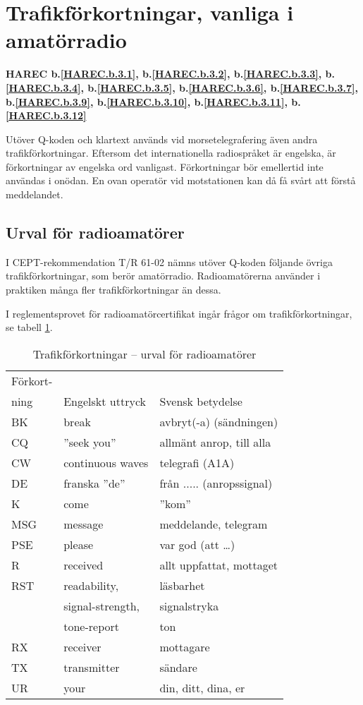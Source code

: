 \section{Trafikförkortningar, vanliga i amatörradio}
\textbf{
HAREC b.\ref{HAREC.b.3.1}\label{myHAREC.b.3.1},
 b.\ref{HAREC.b.3.2}\label{myHAREC.b.3.2},
 b.\ref{HAREC.b.3.3}\label{myHAREC.b.3.3},
 b.\ref{HAREC.b.3.4}\label{myHAREC.b.3.4},
 b.\ref{HAREC.b.3.5}\label{myHAREC.b.3.5},
 b.\ref{HAREC.b.3.6}\label{myHAREC.b.3.6},
 b.\ref{HAREC.b.3.7}\label{myHAREC.b.3.7},
 b.\ref{HAREC.b.3.9}\label{myHAREC.b.3.9},
 b.\ref{HAREC.b.3.10}\label{myHAREC.b.3.10},
 b.\ref{HAREC.b.3.11}\label{myHAREC.b.3.11},
 b.\ref{HAREC.b.3.12}\label{myHAREC.b.3.12}
}

Utöver Q-koden och klartext används vid morsetelegrafering även andra
trafikförkortningar. Eftersom det internationella radiospråket är
engelska, är förkortningar av engelska ord vanligast.  Förkortningar
bör emellertid inte användas i onödan. En ovan operatör vid
motstationen kan då få svårt att förstå meddelandet.

\subsection{Urval för radioamatörer}

I CEPT-rekommendation T/R 61-02 nämns utöver Q-koden följande övriga
trafikförkortningar, som berör amatörradio.  Radioamatörerna använder
i praktiken många fler trafikförkortningar än dessa.

I reglementsprovet för radioamatörcertifikat ingår frågor om
trafikförkortningar, se tabell \ref{tab:trafikförkortningar}.

\begin{table}
  \label{tab:trafikförkortningar}
  \caption{Trafikförkortningar -- urval för radioamatörer}
  \begin{tabular}{lll}
    Förkort- & & \\
    ning & Engelskt uttryck & Svensk betydelse \\
    \hline
    BK & break & avbryt(-a) (sändningen) \\
    CQ & ''seek you'' & allmänt anrop, till alla \\
    CW & continuous waves & telegrafi (A1A) \\
    DE & franska ''de'' & från ..... (anropssignal) \\
    K  & come & ''kom'' \\
    MSG & message & meddelande, telegram \\
    PSE & please & var god (att \dots) \\
    R & received & allt uppfattat, mottaget \\
   RST & readability, & läsbarhet \\
   & signal-strength, & signalstryka \\
   & tone-report & ton \\
    RX & receiver & mottagare \\
    TX & transmitter & sändare \\
    UR & your & din, ditt, dina, er \\
  \end{tabular}
\end{table}

